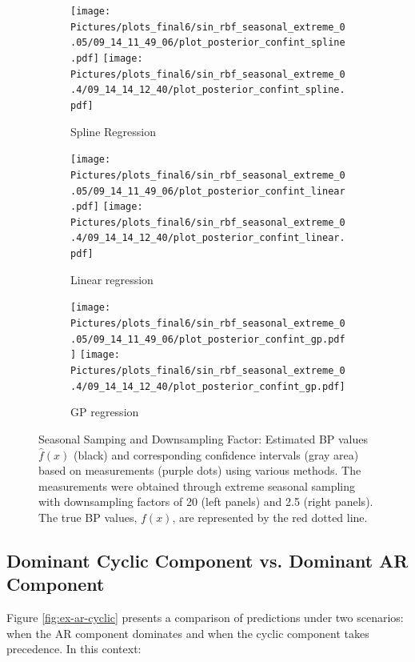 \begin{figure}
\begin{subfigure}{\textwidth}
    \centering
    \texttt{[image: 
    Pictures/plots\_final6/sin\_rbf\_seasonal\_extreme\_0.05/09\_14\_11\_49\_06/plot\_posterior\_confint\_spline.pdf]}
    \texttt{[image: 
    Pictures/plots\_final6/sin\_rbf\_seasonal\_extreme\_0.4/09\_14\_14\_12\_40/plot\_posterior\_confint\_spline.pdf]}
  \caption{Spline Regression}
\end{subfigure}

\begin{subfigure}{\textwidth}
    \centering
    \texttt{[image: 
    Pictures/plots\_final6/sin\_rbf\_seasonal\_extreme\_0.05/09\_14\_11\_49\_06/plot\_posterior\_confint\_linear.pdf]}
    \texttt{[image: 
        Pictures/plots\_final6/sin\_rbf\_seasonal\_extreme\_0.4/09\_14\_14\_12\_40/plot\_posterior\_confint\_linear.pdf]}
  \caption{Linear regression }
\end{subfigure}

\begin{subfigure}{\textwidth}
    \centering
    \texttt{[image: 
    Pictures/plots\_final6/sin\_rbf\_seasonal\_extreme\_0.05/09\_14\_11\_49\_06/plot\_posterior\_confint\_gp.pdf]}
    \texttt{[image: 
       Pictures/plots\_final6/sin\_rbf\_seasonal\_extreme\_0.4/09\_14\_14\_12\_40/plot\_posterior\_confint\_gp.pdf]}
  \caption{GP regression}
\end{subfigure}\hfill

\caption[Seasonal Samping and Downsampling Factor]{Seasonal Samping and Downsampling Factor:
    Estimated BP values $\hat{f}(x)$ (black) and corresponding confidence intervals (gray area)
    based on measurements (purple dots) using various methods.
    The measurements were obtained through extreme seasonal sampling with downsampling
    factors of 20 (left panels) and 2.5 (right panels).
    The true BP values, $f(x)$, are represented by the red dotted line.}
\label{fig:ex-seasonal-sampling}
\end{figure}



\subsection{Dominant Cyclic Component vs. Dominant AR Component}
\label{subsec:dominant-cyclic-component-vs-dominant-ar-component}

Figure \ref{fig:ex-ar-cyclic} presents a comparison of predictions under two
scenarios: when the AR component dominates and when the cyclic component takes precedence. In this context:

